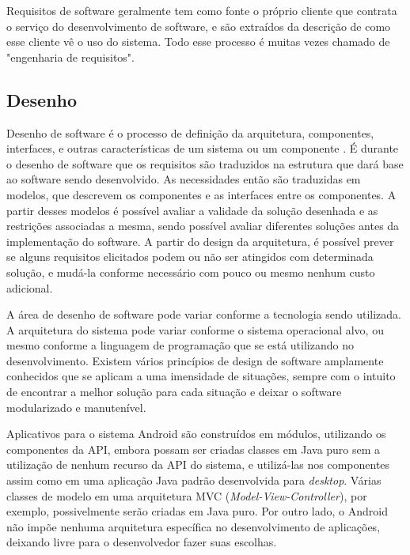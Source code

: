 Requisitos de software geralmente tem como fonte o próprio cliente que contrata o serviço do desenvolvimento de software, e são extraídos da descrição de como esse cliente vê o uso do sistema. Todo esse processo é muitas vezes chamado de "engenharia de requisitos". 


\subsection{Desenho}

Desenho de software é o processo de definição da arquitetura, componentes, interfaces, e outras características de um sistema ou um componente \cite{swebok}. É durante o desenho de software que os requisitos são traduzidos na estrutura que dará base ao software sendo desenvolvido. As necessidades então são traduzidas em modelos, que descrevem os componentes e as interfaces entre os componentes. A partir desses modelos é possível avaliar a validade da solução desenhada e as restrições associadas a mesma, sendo possível avaliar diferentes soluções antes da implementação do software. A partir do design da arquitetura, é possível prever se alguns requisitos elicitados podem ou não ser atingidos com determinada solução, e mudá-la conforme necessário com pouco ou mesmo nenhum custo adicional.

A área de desenho de software pode variar conforme a tecnologia sendo utilizada. A arquitetura do sistema pode variar conforme o sistema operacional alvo, ou mesmo conforme a linguagem de programação que se está utilizando no desenvolvimento. Existem vários princípios de design de software amplamente conhecidos que se aplicam a uma imensidade de situações, sempre com o intuito de encontrar a melhor solução para cada situação e deixar o software modularizado e manutenível.

Aplicativos para o sistema Android são construídos em módulos, utilizando os componentes da API, embora possam ser criadas classes em Java puro sem a utilização de nenhum recurso da API do sistema, e utilizá-las nos componentes assim como em uma aplicação Java padrão desenvolvida para \textit{desktop}. Várias classes de modelo em uma arquitetura MVC (\textit{Model-View-Controller}), por exemplo, possivelmente serão criadas em Java puro. Por outro lado, o Android não impõe nenhuma arquitetura específica no desenvolvimento de aplicações, deixando livre para o desenvolvedor fazer suas escolhas.

